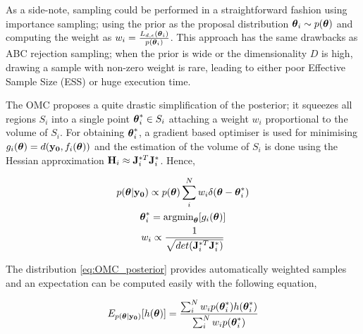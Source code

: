 As a side-note, sampling could be performed in a straightforward
fashion using importance sampling; using the prior as the proposal
distribution $\boldsymbol{\theta}_i \sim p(\boldsymbol{\theta})$ and computing the weight as
$w_i = \frac{L_{d,\epsilon}(\boldsymbol{\theta}_i)}{p(\boldsymbol{\theta}_i)}$. This approach
has the same drawbacks as ABC rejection sampling; when the prior is
wide or the dimensionality $D$ is high, drawing a sample with non-zero
weight is rare, leading to either poor Effective Sample Size (ESS) or
huge execution time.

The OMC proposes a quite drastic simplification of the posterior; it
squeezes all regions $S_i$ into a single point $\boldsymbol{\theta}_i^* \in S_i$
attaching a weight $w_i$ proportional to the volume of $S_i$. For
obtaining $\boldsymbol{\theta}_i^*$, a gradient based optimiser is used for
minimising $g_i(\boldsymbol{\theta}) = d(\mathbf{y_0}, f_i(\boldsymbol{\theta}))$ and the estimation of the volume
of $S_i$ is done using the Hessian approximation $\mathbf{H}_i \approx \mathbf{J}_i^{*T}\mathbf{J}_i^*$. Hence,

\begin{gather} \label{eq:OMC_posterior}
    p(\boldsymbol{\theta}|\mathbf{y_0}) \propto p(\boldsymbol{\theta}) \sum_i^N w_i \delta(\boldsymbol{\theta} - \boldsymbol{\theta}_i^*)\\
  \boldsymbol{\theta}_i^* = \text{argmin}_{\boldsymbol{\theta}} [g_i(\boldsymbol{\theta})] \\
  w_i \propto \frac{1}{\sqrt{det( \mathbf{J}_i^{*T}\mathbf{J}_i^*)}}
\end{gather}

The distribution \eqref{eq:OMC_posterior} provides automatically weighted samples and an expectation can be computed easily with the following equation,

\begin{equation}
  \label{eq:OMC_expectation}
  E_{p(\boldsymbol{\theta}|\mathbf{y_0})}[h(\boldsymbol{\theta})] = \frac{\sum_i^N w_i p(\boldsymbol{\theta}_i^*)h(\boldsymbol{\theta}_i^*)}{\sum_i^N w_i p(\boldsymbol{\theta}_i^*)}
\end{equation}
